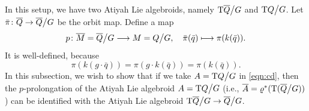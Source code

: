 \documentclass[11pt]{article}
\theoremstyle{plain}
\theoremstyle{definition}
\begin{document}
In this setup, we have two Atiyah Lie algebroids, namely $\mathrm{T}\overline Q\big\slash G$ and $\mathrm{T}Q\big\slash G$.  Let $\bar{\pi}\colon \overline{Q}\to \overline{Q}\big\slash G$ be the orbit map. Define a map
\begin{equation*}
    p\colon \overline{M} = \overline{Q}\big\slash G\longrightarrow M=Q\big\slash G,\quad \bar{\pi}(\bar{q})\longmapsto \pi(k(\bar{q})).
\end{equation*}
It is well-defined, because
\begin{equation*}
    \pi(k(g\cdot \bar{q}))=\pi(g\cdot k(\bar{q}))=\pi(k(\bar{q})).
\end{equation*}
In this subsection, we wish to show that if we take $A=\mathrm{T}Q\big\slash G$ in \eqref{eqn:cd}, then the $p$-prolongation of the Atiyah Lie algebroid $A=\mathrm{T}Q\big\slash G$ (i.e., $\overline{A}=\varrho^{\ast}(\mathrm{T}(\overline Q \big\slash G))$) can be identified with the Atiyah Lie algebroid $\mathrm{T}\overline Q\big\slash G \to \overline Q\big\slash G$.
\end{document}
